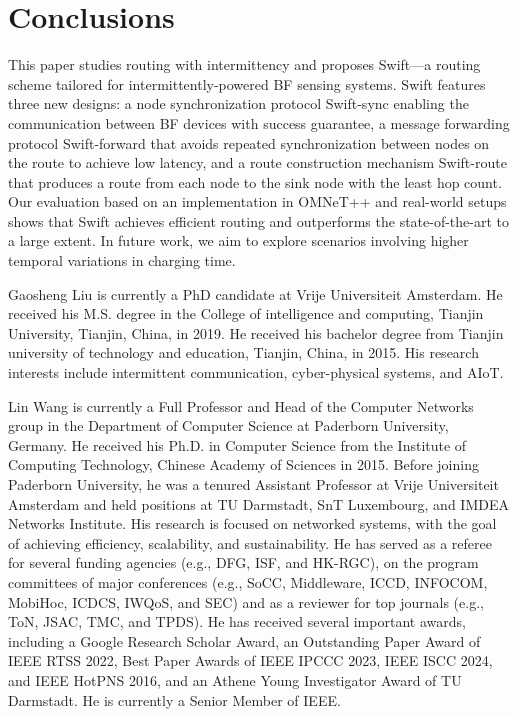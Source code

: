 \documentclass[lettersize,journal]{IEEEtran}
\newcommand{\ours}{Swift\xspace}
\newcommand{\sync}{Swift-sync\xspace}
\newcommand{\route}{Swift-route\xspace}
\newcommand{\forward}{Swift-forward\xspace}
\begin{document}
\section{Conclusions}
\label{sec:conclusions}
This paper studies routing with intermittency and proposes \ours---a routing scheme tailored for intermittently-powered BF sensing systems. \ours features three new designs: a node synchronization protocol \sync enabling the communication between BF devices with success guarantee, a message forwarding protocol \forward that avoids repeated synchronization between nodes on the route to achieve low latency, and a route construction mechanism \route that produces a route from each node to the sink node with the least hop count. Our evaluation based on an implementation in OMNeT++ and real-world setups shows that \ours achieves efficient routing and outperforms the state-of-the-art to a large extent. In future work, we aim to explore scenarios involving higher temporal variations in charging time.






\begin{IEEEbiography}{Gaosheng Liu}
is currently a PhD candidate at Vrije Universiteit Amsterdam. He received his M.S. degree in the College of intelligence and computing, Tianjin University, Tianjin, China, in 2019. He received his bachelor degree from Tianjin university of technology and education, Tianjin, China, in 2015. His research interests include
intermittent communication, cyber-physical systems, and AIoT.
\end{IEEEbiography}

\begin{IEEEbiography}{Lin Wang}
is currently a Full Professor and Head of the Computer Networks group in the Department of Computer Science at Paderborn University, Germany. He received his Ph.D. in Computer Science from the Institute of Computing Technology, Chinese Academy of Sciences in 2015. Before joining Paderborn University, he was a tenured Assistant Professor at Vrije Universiteit Amsterdam and held positions at TU Darmstadt, SnT Luxembourg, and IMDEA Networks Institute. His research is focused on networked systems, with the goal of achieving efficiency, scalability, and sustainability. He has served as a referee for several funding agencies (e.g., DFG, ISF, and HK-RGC), on the program committees of major conferences (e.g., SoCC, Middleware, ICCD, INFOCOM, MobiHoc, ICDCS, IWQoS, and SEC) and as a reviewer for top journals (e.g., ToN, JSAC, TMC, and TPDS). He has received several important awards, including a Google Research Scholar Award, an Outstanding Paper Award of IEEE RTSS 2022, Best Paper Awards of IEEE IPCCC 2023, IEEE ISCC 2024, and IEEE HotPNS 2016, and an Athene Young Investigator Award of TU Darmstadt. He is currently a Senior Member of IEEE. 
\end{IEEEbiography}



\vfill
\end{document}
